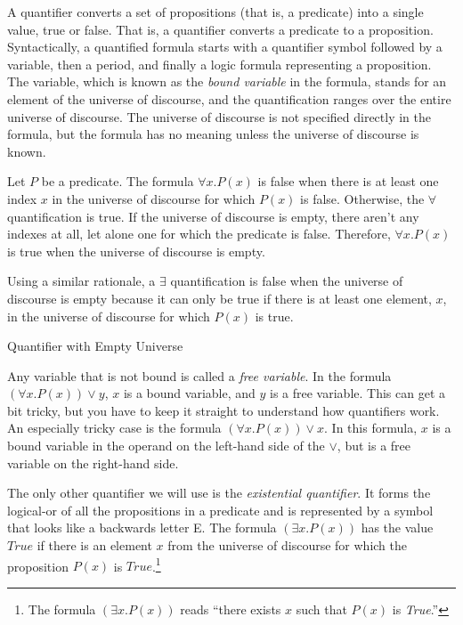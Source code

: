 {{A
\label{def:quantifier}
quantifier converts a set of propositions (that is, a predicate)
into a single value, true or false. That is, a quantifier converts
a predicate to a proposition.
Syntactically, a quantified formula starts with a quantifier symbol followed by
a variable, then a period, and finally a logic formula
representing a proposition. The variable,
which is known as the
\label{def:bound-variable}
\emph{bound variable}
in the formula, stands for an
element of the universe of discourse, and the quantification
ranges over the entire universe of discourse.
The universe of discourse is not specified directly
in the formula, but the formula has no meaning unless
the universe of discourse is known.

\begin{aside}
Let $P$ be a predicate.
The formula
$\forall x.P(x)$
is false when there is
at least one index $x$ in the universe of discourse
for which $P(x)$ is false.
Otherwise, the $\forall$ quantification is true.
If the universe of discourse is empty,
there aren't any indexes at all,
let alone one for which the predicate is false.
Therefore, $\forall x.P(x)$ is true
when the universe of discourse is empty.

Using a similar rationale, a
$\exists$ quantification
is false when the universe of discourse is empty
because it can only be true if there is
at least one element, $x$, in the universe of discourse
for which $P(x)$ is true.
\caption{Quantifier with Empty Universe}
\label{empty-forall}
\end{aside}

Any variable that is not bound is
called a
\label{def:free-variable}\emph{free variable}.
In the formula $(\forall x.P(x)) \vee y$,
$x$ is a bound variable, and $y$ is a free variable.
This can get a bit tricky, but you have to keep it
straight to understand how quantifiers work.
An especially tricky case is the formula
$(\forall x.P(x)) \vee x$.
In this formula, $x$ is a bound variable in the
operand on the left-hand side of the $\vee$,
but is a free variable on the right-hand side.

The only other quantifier we will use is the
\label{def:existential-quantifier}\emph{existential quantifier}.
It forms the logical-or of all the propositions in a predicate
and is represented by a symbol that looks like a backwards letter E.
The  formula $(\exists x.P(x))$
has the value $True$
if there is an element $x$ from the universe of discourse
for which the proposition $P(x)$ is $True$.\footnote{The
formula $(\exists x.P(x))$ reads
``there exists $x$ such that $P(x)$ is \emph{True}.''}

}}
